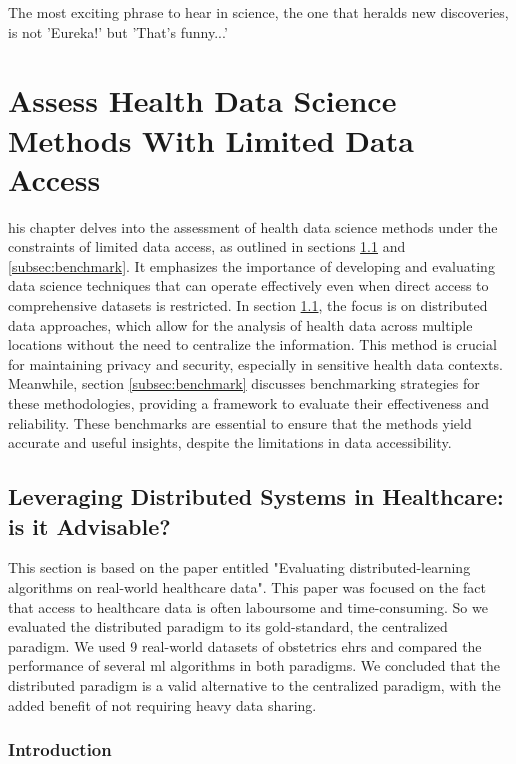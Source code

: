 
\begin{savequote}[75mm]
    The most exciting phrase to hear in science, the one that heralds new discoveries, is not 'Eureka!' but 'That's funny...'
    \end{savequote}

\chapter{Assess Health Data Science Methods With Limited Data Access}\label{chap:goal2}
his chapter delves into the assessment of health data science methods under the constraints of limited data access, as outlined in sections \ref{subsec:distributed} and \ref{subsec:benchmark}. It emphasizes the importance of developing and evaluating data science techniques that can operate effectively even when direct access to comprehensive datasets is restricted. In section \ref{subsec:distributed}, the focus is on distributed data approaches, which allow for the analysis of health data across multiple locations without the need to centralize the information. This method is crucial for maintaining privacy and security, especially in sensitive health data contexts. Meanwhile, section \ref{subsec:benchmark} discusses benchmarking strategies for these methodologies, providing a framework to evaluate their effectiveness and reliability. These benchmarks are essential to ensure that the methods yield accurate and useful insights, despite the limitations in data accessibility.


\section{Leveraging Distributed Systems in Healthcare: is it Advisable?}\label{subsec:distributed}
This section is based on the paper entitled "Evaluating distributed-learning algorithms on real-world healthcare data". This paper was focused on the fact that access to healthcare data is often laboursome and time-consuming. So we evaluated the distributed paradigm to its gold-standard, the centralized paradigm. We used 9 real-world datasets of obstetrics \acp{ehr} and compared the performance of several \ac{ml} algorithms in both paradigms. We concluded that the distributed paradigm is a valid alternative to the centralized paradigm, with the added benefit of not requiring heavy data sharing.

\subsection{Introduction}

